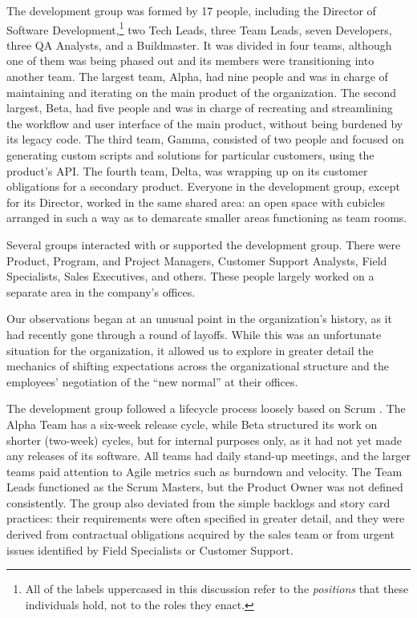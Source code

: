 \documentclass[10pt, conference, compsocconf]{IEEEtran}
\begin{document}
The development group was formed by 17 people, including the Director of Software Development,\footnote{All of the labels uppercased in this discussion refer to the \emph{positions} that these individuals hold, not to the roles they enact.} two Tech Leads, three Team Leads, seven Developers, three QA Analysts, and a Buildmaster. It was divided in four teams, although one of them was being phased out and its members were transitioning into another team. The largest team, Alpha, had nine people and was in charge of maintaining and iterating on the main product of the organization. The second largest, Beta, had five people and was in charge of recreating and streamlining the workflow and user interface of the main product, without being burdened by its legacy code. The third team, Gamma, consisted of two people and focused on generating custom scripts and solutions for particular customers, using the product's API. The fourth team, Delta, was wrapping up on its customer obligations for a secondary product. Everyone in the development group, except for its Director, worked in the same shared area: an open space with cubicles arranged in such a way as to demarcate smaller areas functioning as team rooms.

Several groups interacted with or supported the development group. There were Product, Program, and Project Managers, Customer Support Analysts, Field Specialists, Sales Executives, and others. These people largely worked on a separate area in the company's offices.

Our observations began at an unusual point in the organization's history, as it had recently gone through a round of layoffs. While this was an unfortunate situation for the organization, it allowed us to explore in greater detail the mechanics of shifting expectations across the organizational structure and the employees' negotiation of the ``new normal'' at their offices.

The development group followed a lifecycle process loosely based on Scrum \cite{Schwaber2001}. The Alpha Team has a six-week release cycle, while Beta structured its work on shorter (two-week) cycles, but for internal purposes only, as it had not yet made any releases of its software. All teams had daily stand-up meetings, and the larger teams paid attention to Agile metrics such as burndown and velocity. The Team Leads functioned as the Scrum Masters, but the Product Owner was not defined consistently. The group also deviated from the simple backlogs and story card practices: their requirements were often specified in greater detail, and they were derived from contractual obligations acquired by the sales team or from urgent issues identified by Field Specialists or Customer Support.
\end{document}
